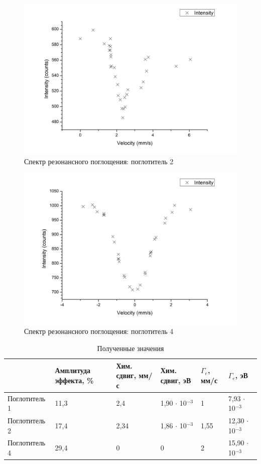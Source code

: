 \documentclass[a4paper]{article}
\begin{document}
\begin{enumerate}
\begin{figure}[h]
    \centering
    \includegraphics[width=12cm]{Graph3}
    \caption{Спектр резонансного поглощения: поглотитель 2}
    \label{fig:vac}
\end{figure}

\begin{figure}[h]
    \centering
    \includegraphics[width=12cm]{Graph4}
    \caption{Спектр резонансного поглощения: поглотитель 4}
    \label{fig:vac}
\end{figure}


\begin{table}[h]
    \centering
    \begin{center}
    \caption{Полученные значения}
    \end{center}
    \vspace{0.1cm}
    \label{tab:my_label}
    \begin{tabular}{ |p{3cm}||p{2cm}|p{2cm}|p{2cm}|p{2cm}|p{2cm}|}
\hline
    & Амплитуда эффекта, \% & Хим. сдвиг, мм/с & Хим. сдвиг, эВ & $\Gamma_e$, мм/с & $\Gamma_e$, эВ  \\
\hline
\hline
Поглотитель 1 & 11,3 & 2,4 & 1,90 $\cdot$ 10$^{-3}$ & 1 & 7,93 $\cdot$ 10$^{-3}$\\
\hline
Поглотитель 2 & 17,4 & 2,34 & 1,86 $\cdot$ 10$^{-3}$ & 1,55 & 12,30 $\cdot$ 10$^{-3}$\\
\hline
Поглотитель 4 & 29,4 & 0 & 0 & 2 & 15,90 $\cdot$ 10$^{-3}$\\
\hline
\end{tabular}
\end{table} 


\end{enumerate}
\end{document}
